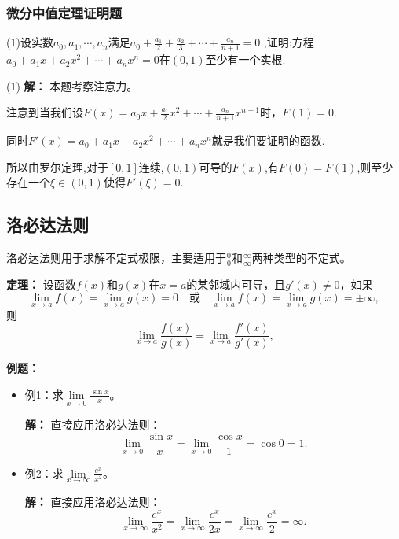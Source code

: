 \documentclass[12pt , a4paper , oneside]{ctexart}
\begin{document}
            \subsubsection{微分中值定理证明题}
            (1)设实数$a_0,a_1,\cdots,a_n$满足$a_0+\frac{a_1}{2}+\frac{a_2}{3}+\cdots+\frac{a_n}{n+1}=0$
            ,证明:方程$a_0+a_1 x+a_2 x^2+\cdots+a_n x^n=0$在$(0,1)$至少有一个实根.

            \begin{mdframed}
            (1) \textbf{解：}
            本题考察注意力。

            注意到当我们设$F(x) = a_0 x + \frac{a_1}{2} x^2 + \cdots + \frac{a_n}{n+1} x^{n+1}$时，$F(1) = 0$.

            同时$F'(x) = a_0 + a_1 x + a_2 x^2 + \cdots + a_n x^n$就是我们要证明的函数.

            所以由罗尔定理,对于$[0,1]$连续,$(0,1)$可导的$F(x)$,有$F(0)=F(1)$,则至少存在一个$\xi \in (0,1)$使得$F'(\xi) = 0$.

            \end{mdframed}
        \subsection{洛必达法则}
            洛必达法则用于求解不定式极限，主要适用于$\frac{0}{0}$和$\frac{\infty}{\infty}$两种类型的不定式。

            \textbf{定理：}
            设函数$f(x)$和$g(x)$在$x=a$的某邻域内可导，且$g'(x) \neq 0$，如果
            $$\lim\limits_{x \to a} f(x) = \lim\limits_{x \to a} g(x) = 0 \quad \text{或} \quad \lim\limits_{x \to a} f(x) = \lim\limits_{x \to a} g(x) = \pm \infty,$$
            则
            $$\lim\limits_{x \to a} \frac{f(x)}{g(x)} = \lim\limits_{x \to a} \frac{f'(x)}{g'(x)},$$

            \textbf{例题：}
            \begin{itemize}
                \item 例1：求$\lim\limits_{x \to 0} \frac{\sin x}{x}$。
                \begin{mdframed}
                \textbf{解：}
                直接应用洛必达法则：
                $$\lim\limits_{x \to 0} \frac{\sin x}{x} = \lim\limits_{x \to 0} \frac{\cos x}{1} = \cos 0 = 1.$$
                \end{mdframed}

                \item 例2：求$\lim\limits_{x \to \infty} \frac{e^x}{x^2}$。
                \begin{mdframed}
                \textbf{解：}
                直接应用洛必达法则：
                $$\lim\limits_{x \to \infty} \frac{e^x}{x^2} = \lim\limits_{x \to \infty} \frac{e^x}{2x} = \lim\limits_{x \to \infty} \frac{e^x}{2} = \infty.$$
                \end{mdframed}
            \end{itemize}
\end{document}
